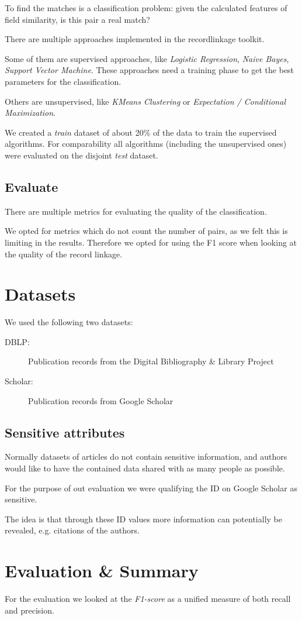 \documentclass[sigconf,nonacm]{acmart}
\begin{document}
To find the matches is a classification problem: given the calculated features
of field similarity, is this pair a real match?

There are multiple approaches implemented in the recordlinkage toolkit.

Some of them are supervised approaches, like \emph{Logistic Regression},
\emph{Naive Bayes}, \emph{Support Vector Machine}.
These approaches need a training phase to get the best parameters for
the classification.

Others are unsupervised, like \emph{KMeans Clustering} or
\emph{Expectation / Conditional Maximization}.

We created a \emph{train} dataset of about 20\% of the data to train
the supervised algorithms.
For comparability all algorithms (including the unsupervised ones)
were evaluated on the disjoint \emph{test} dataset.

\subsection{Evaluate}

There are multiple metrics for evaluating the quality of the classification.

We opted for metrics which do not count the number of pairs, as we felt
this is limiting in the results.
Therefore we opted for using the F1 score when looking at the quality
of the record linkage.

\section{Datasets}

We used the following two datasets:
\begin{description}
\item[DBLP:] Publication records from the Digital Bibliography \& Library Project
\item[Scholar:] Publication records from Google Scholar
\end{description}

\subsection{Sensitive attributes}

Normally datasets of articles do not contain sensitive information,
and authors would like to have the contained data shared with
as many people as possible.

For the purpose of out evaluation we were qualifying the
ID on Google Scholar as sensitive.

The idea is that through these ID values more information
can potentially be revealed, e.g. citations of the authors.

\section{Evaluation \& Summary}

For the evaluation we looked at the \emph{F1-score} as a unified
measure of both recall and precision.



\end{document}
